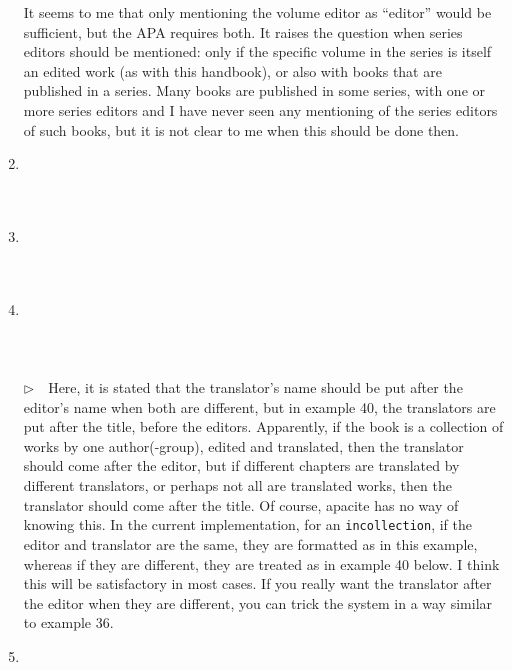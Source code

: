 \documentclass{article}
\newcommand{\EM}{\ensuremath{\triangleright\quad}}
\newcommand{\pkg}[1]{\textsf{#1}}%
\newcommand{\entryname}[1]{\texttt{#1}}%
\begin{document}
\begin{enumerate}
      It seems to me that only mentioning the
      volume editor as ``editor'' would be sufficient, but the APA
      requires both. It raises the question when series editors
      should be mentioned: only if the specific volume in the
      series is itself an edited work (as with this handbook),
      or also with books that are published in a series. Many books
      are published in some series, with one or more series editors
      and I have never seen any mentioning of the series editors of
      such books, but it is not clear to me when this should be done
      then.
\item \cite{ex37} \\ \cite{ex37}\\ \\ 
\item \cite{ex38} \\ \cite{ex38}\\ \\ 
\item \cite{ex39} \\ \cite{ex39}\\ \\ \\
      \EM Here, it is stated that the translator's name should be put
      after the editor's name when both are different, but in example
      40, the translators are put after the title, before the editors.
      Apparently, if the book is a collection of works by one
      author(-group), edited and translated, then the translator
      should come after the editor, but if different chapters
      are translated by different translators, or perhaps not all
      are translated works, then the translator should come after
      the title. Of course, \pkg{apacite} has no way of knowing this.
      In the current implementation, for an \entryname{incollection},
      if the editor and translator are the same, they are formatted as
      in this example, whereas if they are different, they are treated
      as in example 40 below. I think this will be satisfactory in
      most cases. If you really want the translator after the editor
      when they are different, you can trick the system in a way
      similar to example 36.
\item \cite{ex40} \\ \cite{ex40}\\ \\ \\

\end{enumerate}
\end{document}
